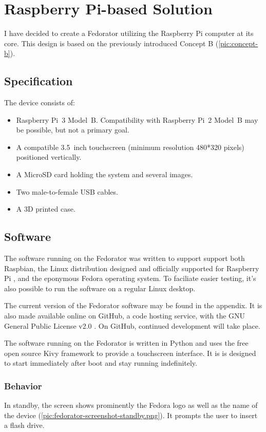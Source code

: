 \chapter{Raspberry Pi-based Solution}
    I have decided to create a Fedorator utilizing the Raspberry Pi computer at its core.  This design is based on the previously introduced Concept B (\ref{pic:concept-b}).
    \section{Specification}
        The device consists of:
        \begin{itemize}
            \item Raspberry Pi~3 Model~B.  Compatibility with Raspberry Pi~2 Model~B may be possible, but not a primary goal.
            \item A compatible 3.5~inch touchscreen (minimum resolution 480*320 pixels) positioned vertically.
            \item A MicroSD card holding the system and several images.
            \item Two male-to-female USB cables.
            \item A 3D printed case.
        \end{itemize}
    
    \section{Software}
        The software running on the Fedorator was written to support support both Raspbian, the Linux distribution designed and officially supported for Raspberry Pi \cite{raspbian}, and the eponymous Fedora operating system.  To faciliate easier testing, it's also possible to run the software on a regular Linux desktop.
        
        The current version of the Fedorator software may be found in the appendix.  It is also made available online on GitHub, a code hosting service, with the GNU General Public License v2.0 \cite{fedorator-github}.  On GitHub, continued development will take place.
        
        The software running on the Fedorator is written in Python and uses the free open source Kivy framework \cite{kivy} to provide a touchscreen interface.  It is is designed to start immediately after boot and stay running indefinitely.
        
        \subsection{Behavior}
            In standby, the screen shows prominently the Fedora logo as well as the name of the device (\ref{pic:fedorator-screenshot-standby.png}).  It prompts the user to insert a flash drive.
            
